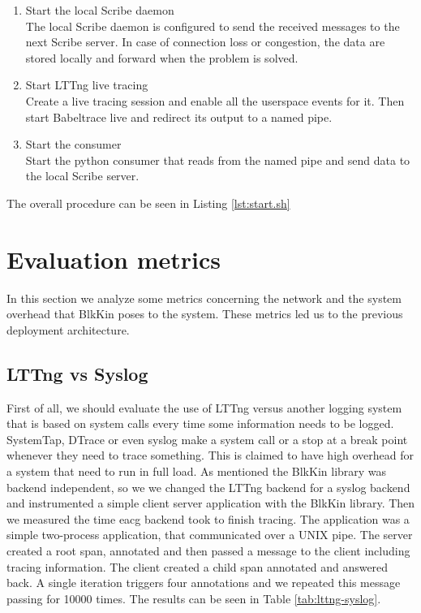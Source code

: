 \begin{enumerate}
\item Start the local Scribe daemon \\ 
    The local Scribe daemon is configured to send the received messages to the
    next Scribe server. In case of connection loss or congestion, the data are
    stored locally and forward when the problem is solved.

\item Start LTTng live tracing \\
    Create a live tracing session and enable all the userspace events for it.
    Then start Babeltrace live and redirect its output to a named pipe.

\item Start the consumer \\
    Start the python consumer that reads from the named pipe and send data to
    the local Scribe server.  
\end{enumerate}

The overall procedure can be seen in Listing \ref{lst:start.sh}
\section{Evaluation metrics}\label{sec:metrics}

In this section we analyze some metrics concerning the network and the system
overhead that BlkKin poses to the system. These metrics led us to the previous
deployment architecture.

\subsection{LTTng vs Syslog}
First of all, we should evaluate the use of LTTng versus another logging system
that is based on system calls every time some information needs to be logged.
SystemTap, DTrace or even syslog make a system call or a stop at a break point
whenever they need to trace something. This is claimed to have high overhead for
a system that need to run in full load. As mentioned the BlkKin library was
backend independent, so we we changed the LTTng backend for a syslog backend and
instrumented a simple client server application with the BlkKin library. Then we
measured the time eacg backend took to finish tracing. The application was a
simple two-process application, that communicated over a UNIX pipe. The server
created a root span, annotated and then passed a message to the client including
tracing information. The client created a child span annotated and answered
back. A single iteration triggers four annotations and we repeated this message
passing for 10000 times. The results can be seen in Table
\ref{tab:lttng-syslog}. 

